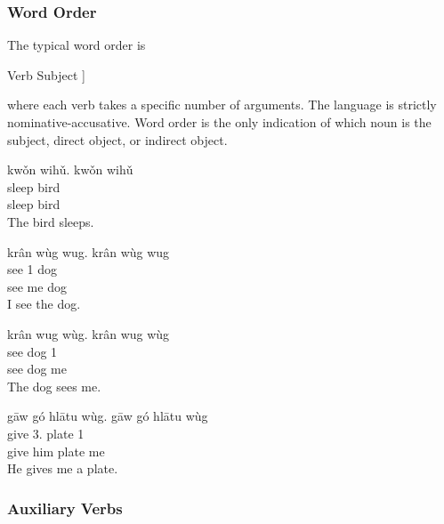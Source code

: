 \documentclass[12pt]{article}
\begin{document}
    \subsubsection*{Word Order}

    The typical word order is
    \begin{center}
        \quad Verb \quad Subject \quad [\quad Direct Object \quad  [ \quad Indirect Object \quad ] \quad ]
    \end{center}
    where each verb takes a specific number of arguments.
    The language is strictly nominative-accusative.
    Word order is the only indication of which noun is the subject, direct object, or indirect object.

    \begin{exe}
        \ex
        \glt
        kwǒn wihǔ.
        \glll
        kwǒn wihǔ \\
        sleep bird \\
        sleep bird \\
        \glt
        The bird sleeps.
    \end{exe}

    \begin{exe}
        \ex
        \glt
        krân wùg wug.
        \glll
        krân wùg wug \\
        see 1\Sg{} dog \\
        see me dog \\
        \glt
        I see the dog.
    \end{exe}

    \begin{exe}
        \ex
        \glt
        krân wug wùg.
        \glll
        krân wug wùg \\
        see dog 1\Sg{} \\
        see dog me \\
        \glt
        The dog sees me.
    \end{exe}

    \begin{exe}
        \ex
        \glt
        gāw gó hlātu wùg.
        \glll
        gāw gó hlātu wùg \\
        give 3\Sg{}.\Anim{} plate 1\Sg{} \\
        give him plate me \\
        \glt
        He gives me a plate.
    \end{exe}

    \subsubsection*{Auxiliary Verbs}
\end{document}
